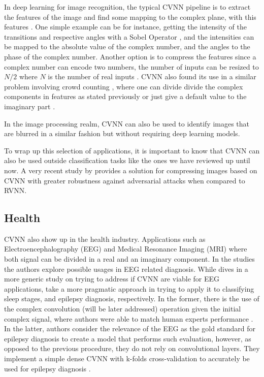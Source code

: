 In deep learning for image recognition, the typical \gls{CVNN} pipeline is to extract the features of the image and find some mapping to the complex plane, with this features \parencite{gu2018convcvnnvgg, chiheb2017deep}. One simple example can be for instance, getting the intensity of the transitions and respective angles with a Sobel Operator \parencite{sobel2014operator}, and the intensities can be mapped to the absolute value of the complex number, and the angles to the phase of the complex number. Another option is to compress the features since a complex number can encode two numbers, the number of inputs can be resized to $ N/2 $ where $ N $ is the number of real inputs \parencite{gu2018convcvnnvgg}. \gls{CVNN} also found its use in a similar problem involving crowd counting \parencite{matlacz2018crowd}, where one can divide divide the complex components in features as stated previously or just give a default value to the imaginary part \parencite{chiheb2017deep, matlacz2018crowd}.

In the image processing realm, \gls{CVNN} can also be used to identify images that are blurred \parencite{aizenberg2008blurdetect, aizenberg2011blurbetter} in a similar fashion but without requiring deep learning models.

To wrap up this selection of applications, it is important to know that \gls{CVNN} can also be used outside classification tasks like the ones we have reviewed up until now. A very recent study by \textcite{luo2024imagecompressalgocvnn} provides a solution for compressing images based on \gls{CVNN} with greater robustness against adversarial attacks when compared to \gls{RVNN}.

\subsection{Health}

\gls{CVNN} also show up in the health industry. Applications such as Electroencephalography (EEG) and Medical Resonance Imaging (MRI) where both signal can be divided in a real and an imaginary component. In the studies \parencite{du2023hybrid, zhang2017sleepsignal, peker2016eegsignal} the authors explore possible usages in EEG related diagnosis. While \parencite{du2023hybrid} dives in a more generic study on trying to address if \gls{CVNN} are viable for EEG applications, \parencite{zhang2017sleepsignal, peker2016eegsignal} take a more pragmatic approach in trying to apply it to classifying sleep stages, and epilepsy diagnosis, respectively. In the former, there is the use of the complex convolution (will be later addressed) operation given the initial complex signal, where authors were able to match human experts performance \parencite{zhang2017sleepsignal}. In the latter, authors consider the relevance of the EEG as the gold standard for epilepsy diagnosis \parencite{pillai2006epi} to create a model that performs such evaluation, however, as opposed to the previous procedure, they do not rely on convolutional layers. They implement a simple dense \gls{CVNN} with k-folds cross-validation to accurately be used for epilepsy diagnosis \parencite{peker2016eegsignal}.

